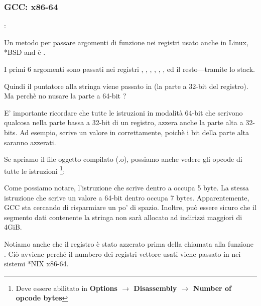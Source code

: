 \subsubsection{GCC: x86-64}

\ITAph{}:



Un metodo per passare argomenti di funzione nei registri usato anche in Linux, *BSD and \MacOSX è \SysVABI.

I primi 6 argomenti sono passati nei registri \RDI, \RSI, \RDX, \RCX, ,   , ed il resto---tramite lo stack.

Quindi il puntatore alla stringa viene passato in \EDI (la parte a 32-bit del registro).
Ma perchè no nusare la parte a 64-bit \RDI?

E' importante ricordare che tutte le istruzioni \MOV in modalità 64-bit che scrivono qualcosa nella parte bassa a 32-bit di un registro, azzera anche la parte alta a 32-bits.
Ad esempio,  scrive un valore in \RAX correttamente, poichè i bit della parte alta saranno azzerati.

Se apriamo il file oggetto compilato (.o), possiamo anche vedere gli opcode di tutte le istruzioni
\footnote{Deve essere abilitato in \textbf{Options $\rightarrow$ Disassembly $\rightarrow$ Number of opcode bytes}}:



\label{hw_EDI_instead_of_RDI}
Come possiamo notare, l'istruzione che scrive dentro \EDI a  occupa 5 byte.
La stessa istruzione che scrive un valore a 64-bit dentro \RDI occupa 7 bytes.
Apparentemente, GCC sta cercando di risparmiare un po' di spazio.
Inoltre, può essere sicuro che il segmento dati contenente la stringa non sarà allocato ad indirizzi maggiori di 4\gls{GiB}.

\label{SysVABI_input_EAX}
Notiamo anche che il registro \EAX è stato azzerato prima della chiamata alla funzione \printf .
Ciò avviene perché il numbero dei registri vettore usati viene passato in \EAX nei sistemi *NIX x86-64.

